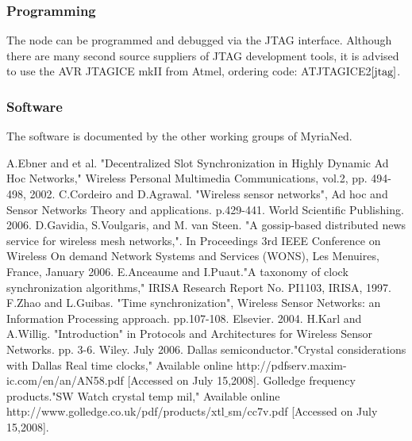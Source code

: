 \documentclass[a4paper,10pt]{report}
\begin{document}
\subsubsection{Programming}
The node can be programmed and debugged via the JTAG interface. Although there are many second source suppliers of JTAG development tools, it is advised to use the AVR JTAGICE mkII from Atmel, ordering code: ATJTAGICE2$\cite{jtag}$.
\subsubsection{Software}
The software is documented by the other working groups of MyriaNed.
\begin{thebibliography}{\textbf{References}}
A.Ebner and et al. "Decentralized Slot Synchronization in Highly Dynamic Ad Hoc Networks," Wireless Personal Multimedia Communications, vol.2, pp. 494- 498, 2002.
C.Cordeiro and D.Agrawal. "Wireless sensor networks", Ad hoc and Sensor Networks Theory and applications. p.429-441. World Scientific Publishing. 2006.
D.Gavidia, S.Voulgaris, and M. van Steen. "A gossip-based distributed news service for wireless mesh networks,". In Proceedings 3rd IEEE Conference on Wireless On demand Network Systems and Services (WONS), Les Menuires, France, January 2006.
E.Anceaume and I.Puaut."A taxonomy of clock synchronization algorithms," IRISA Research Report No. PI1103, IRISA, 1997.
F.Zhao and  L.Guibas. "Time synchronization", Wireless Sensor Networks: an Information Processing approach. pp.107-108. Elsevier. 2004.
H.Karl and A.Willig. "Introduction" in Protocols and Architectures for Wireless Sensor Networks. pp. 3-6. Wiley. July 2006.
Dallas semiconductor."Crystal considerations with Dallas Real time clocks," Available online http:\slash \slash pdfserv.maxim-ic.com\slash en\slash an\slash AN58.pdf [Accessed on July 15,2008].
Golledge frequency products."SW Watch crystal temp mil," Available online http:\slash \slash www.golledge.co.uk\slash pdf\slash products\slash xtl$\_$sm\slash cc7v.pdf [Accessed on July 15,2008].

\end{thebibliography}
\end{document}
